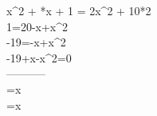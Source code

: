 x^2 + *x + 1 = 2x^2 + 10*2\\
1=20-\cdot x+x^2\\
-19=-\cdot x+x^2\\
-19+\cdot x-x^2=0\\
-----------\\
=x\\
=x
